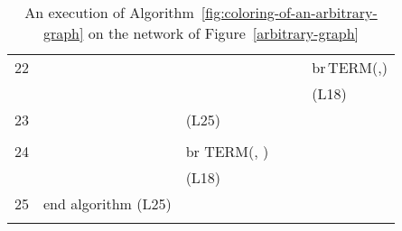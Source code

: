 \documentclass[11pt,english]{article}
\begin{document}
\begin{table}[h]
\begin{tabular}{|p{0.66cm}|p{2.7cm}|p{3.4cm}|p{2.95 cm}|p{2.46cm}|p{1.93cm}|}
22 & &  &  &   & \hspace{-0.27 cm }  br\,TERM(,) \\
& & & &  & \hspace{-8 pt}  (L18) \\\hline

23 & &   (L25) &  &   &  \\
& & & &  & \\\hline

24 & &  br TERM(,  )  &  &   &  \\
& &  (L18) & &  & \\\hline

25 & end algorithm (L25) &    &  &   &  \\
& & & &  & \\\hline

\end{tabular}
\caption{An execution of Algorithm~\ref{fig:coloring-of-an-arbitrary-graph}
on the network of Figure~\ref{arbitrary-graph}}
\label{fig:table-example}
\end{table}
\end{document}
